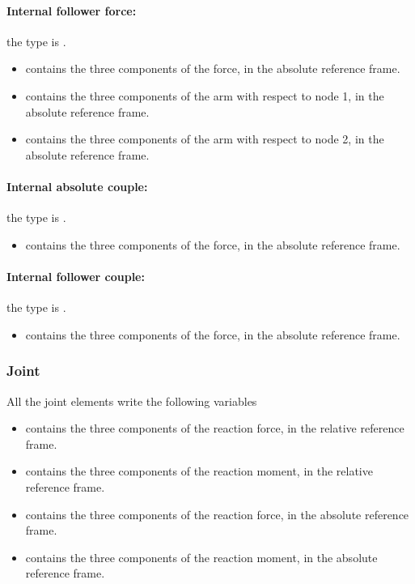 \paragraph{Internal follower force:}
the type is .
\begin{itemize}
\item {} contains the three components of the force, in the absolute reference frame.
\item {} contains the three components of the arm with respect to node 1, in the absolute reference frame.
\item {} contains the three components of the arm with respect to node 2, in the absolute reference frame.
\end{itemize}

\paragraph{Internal absolute couple:}
the type is .
\begin{itemize}
\item {} contains the three components of the force, in the absolute reference frame.
\end{itemize}

\paragraph{Internal follower couple:}
the type is .
\begin{itemize}
\item {} contains the three components of the force, in the absolute reference frame.
\end{itemize}

\subsubsection{Joint} 
\label{sec:NetCDF:Elem:Joint}

All the joint elements write the following variables
\begin{itemize}
\item {} contains the three components of the reaction
  force, in the relative reference frame.
\item {} contains the three components of the reaction
  moment, in the relative reference frame.
\item {} contains the three components of the reaction
  force, in the absolute reference frame.
\item {} contains the three components of the reaction
  moment, in the absolute reference frame.
\end{itemize}

